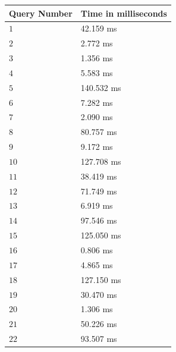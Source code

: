 \documentclass{exam}
\begin{document}
\begin{center}
\begin{tabular}{ | p{5cm} | p{5cm} |  }
\hline \centering \textbf{Query Number } & \textbf{Time in milliseconds} \\
\hline \centering \texttt{$1$} &  42.159 ms\\
\hline \centering \texttt{$2$} &  2.772 ms\\
\hline \centering \texttt{$3$} &  1.356 ms\\
\hline \centering \texttt{$4$} &  5.583 ms\\
\hline \centering \texttt{$5$} &  140.532 ms\\
\hline \centering \texttt{$6$} &  7.282 ms\\
\hline \centering \texttt{$7$} &  2.090 ms\\
\hline \centering \texttt{$8$} &  80.757 ms\\
\hline \centering \texttt{$9$} & 9.172 ms\\
\hline \centering \texttt{$10$} & 127.708 ms\\
\hline \centering \texttt{$11$} &  38.419 ms\\
\hline \centering \texttt{$12$} & 71.749 ms\\
\hline \centering \texttt{$13$} & 6.919 ms\\
\hline \centering \texttt{$14$} &  97.546 ms\\
\hline \centering \texttt{$15$} & 125.050 ms\\
\hline \centering \texttt{$16$} & 0.806 ms\\
\hline \centering \texttt{$17$} & 4.865 ms\\
\hline \centering \texttt{$18$} & 127.150 ms\\
\hline \centering \texttt{$19$} & 30.470 ms\\
\hline \centering \texttt{$20$} &  1.306 ms\\
\hline \centering \texttt{$21$} & 50.226 ms\\
\hline \centering \texttt{$22$} & 93.507 ms \\
\hline
\end{tabular}
\end{center}
\end{document}
